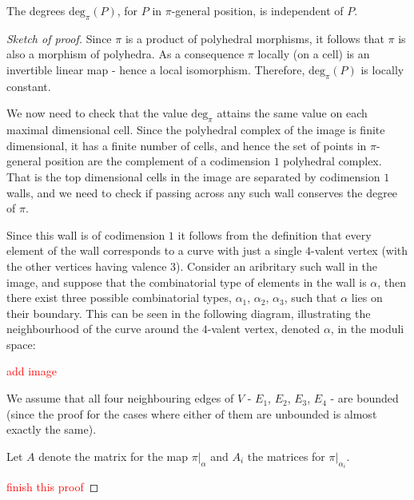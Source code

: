 \begin{proposition}
    The degrees $\text{deg}_{\pi}(P)$, for $P$ in $\pi$-general position, is independent of $P$.
\end{proposition}
\begin{proof}[Sketch of proof]
    Since $\pi$ is a product of polyhedral morphisms, it follows that $\pi$ is also a morphism of polyhedra.
    As a consequence $\pi$ locally (on a cell) is an invertible linear map - hence a local isomorphism. 
    Therefore, $\text{deg}_{\pi}(P)$ is locally constant.
    \par We now need to check that the value $\text{deg}_{\pi}$ attains the same value on each maximal dimensional cell. 
    Since the polyhedral complex of the image is finite dimensional, it has a finite number of cells, and hence the set of points in $\pi$-general position are the complement of a codimension $1$ polyhedral complex. 
    That is the top dimensional cells in the image are separated by codimension $1$ walls, and we need to check if passing across any such wall conserves the degree of $\pi$.
    \par Since this wall is of codimension $1$ it follows from the definition that every element of the wall corresponds to a curve with just a single $4$-valent vertex (with the other vertices having valence $3$). 
    Consider an aribritary such wall in the image, and suppose that the combinatorial type of elements in the wall is $\alpha$, then there exist three possible combinatorial types, $\alpha_{1},\, \alpha_{2},\,\alpha_{3}$, such that $\alpha$ lies on their boundary.
    This can be seen in the following diagram, illustrating the neighbourhood of the curve around the $4$-valent vertex, denoted $\alpha$, in the moduli space:
    \par \textcolor{red}{add image}
    \par We assume that all four neighbouring edges of $V$ - $E_{1}$, $E_{2}$, $E_{3}$, $E_{4}$ - are bounded (since the proof for the cases where either of them are unbounded is almost exactly the same). 
    \par Let $A$ denote the matrix for the map $\pi|_{\alpha}$ and $A_{i}$ the matrices for $\pi|_{\alpha_{i}}$.
    \par \textcolor{red}{finish this proof}
\end{proof}

\begin{example}[Looking at $M_{4}$]
    
\end{example}


